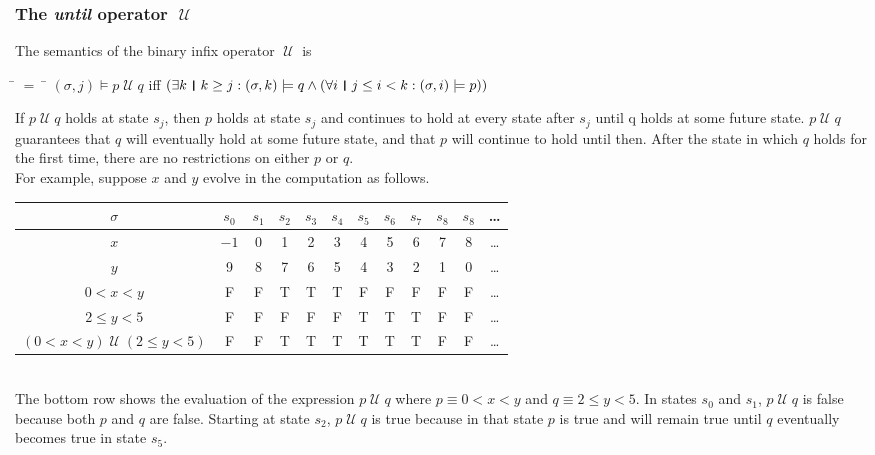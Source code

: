 \documentclass[fleqn, leqno]{article}
\newcommand{\mymathindent}{24pt} %
\newcommand{\Until}{\;\mathcal{U}\;}
\newcommand{\thedr}{\rule[-.25ex]{.32mm}{1.75ex}} %
\newcommand{\dr}{\;\,\thedr\,\;} %
\newcommand{\rb}{:} %
\newcommand{\all}{\forall} %
\newcommand{\ext}{\exists} %
\begin{document}
\subsubsection*{The \textit{until} operator $\Until$}

The semantics of the binary infix operator $\Until$ is

\begin{tabbing}
\hspace{\mymathindent} \= $= \;$ \= \kill
\> $(\sigma, j) \models p \Until q$ \quad iff \quad $(\ext k \dr k \ge j \rb (\sigma,k) \models q \land
(\all i \dr j\le i < k \rb (\sigma,i) \models p))$
\end{tabbing}

If $p \Until q$ holds at state $s_j$, then $p$ holds at state $s_j$ and continues to hold at every state
after $s_j$ until q holds at some future state.
$p \Until q$ guarantees that $q$ will eventually hold at some future state, and that $p$ will continue to
hold until then.
After the state in which $q$ holds for the first time, there are no restrictions on either $p$ or $q$.\\

For example, suppose $x$ and $y$ evolve in the computation as follows.\\

\begin{tabular}{c|ccccccccccc}
$\sigma$ & $s_0$ & $s_1$ & $s_2$ & $s_3$ & $s_4$ & $s_5$ & $s_6$ & $s_7$ & $s_8$ & $s_8$ & \dots \\
\hline
$x$ & $-1$ & 0 & 1 & 2 & 3 & 4 & 5 & 6 & 7 & 8 & \dots\\
$y$ & 9 & 8 & 7 & 6 & 5 & 4 & 3 & 2 & 1 & 0 & \dots\\
$0<x<y$ & F & F & T & T & T & F & F & F & F & F & \dots\\
$2\le y<5$ & F & F & F & F & F & T & T & T & F & F & \dots\\
$(0<x<y)\Until(2\le y<5)$ & F & F & T & T & T & T & T & T & F & F & \dots\\
\end{tabular}\\

The bottom row shows the evaluation of the expression $p\Until q$ where $p\equiv 0<x<y$ and $q\equiv 2\le y<5$.
In states $s_0$ and $s_1$, $p\Until q$ is false because both $p$ and $q$ are false.
Starting at state $s_2$, $p\Until q$ is true because in that state $p$ is true and will remain true until $q$
eventually becomes true in state $s_5$.\\
\end{document}
